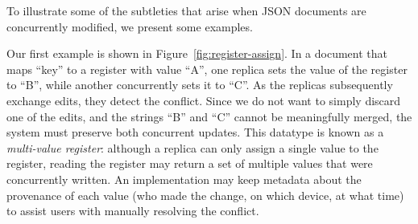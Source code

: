\documentclass[10pt,journal,compsoc]{IEEEtran}
\begin{document}
\begin{figure*}
\centering
{}
\caption{Concurrent assignment to a register.}\label{fig:register-assign}
\end{figure*}

To illustrate some of the subtleties that arise when JSON documents are concurrently modified, we present some examples.

Our first example is shown in Figure~\ref{fig:register-assign}. In a document that maps ``key'' to a register with value ``A'', one replica sets the value of the register to ``B'', while another concurrently sets it to ``C''. As the replicas subsequently exchange edits, they detect the conflict. Since we do not want to simply discard one of the edits, and the strings ``B'' and ``C'' cannot be meaningfully merged, the system must preserve both concurrent updates. This datatype is known as a \emph{multi-value register}: although a replica can only assign a single value to the register, reading the register may return a set of multiple values that were concurrently written. An implementation may keep metadata about the provenance of each value (who made the change, on which device, at what time) to assist users with manually resolving the conflict.
\end{document}
